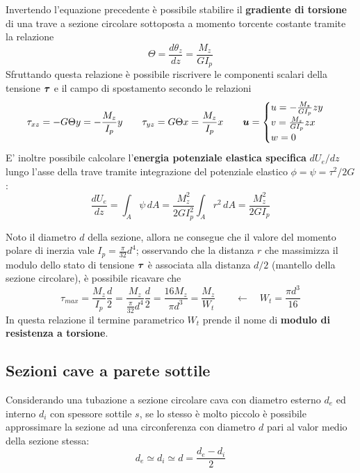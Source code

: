     	\begin{concetto}
    		Invertendo l'equazione precedente è possibile stabilire il \textbf{gradiente di torsione} di una trave a sezione circolare sottoposta a momento torcente costante tramite la relazione
    		\begin{equation}
    			\Theta = \frac{d\theta_z}{dz}= \frac{M_z}{G I_p}
    		\end{equation}
    		Sfruttando questa relazione è possibile riscrivere le componenti scalari della tensione $\boldsymbol{\tau}$ e il campo di spostamento secondo le relazioni
    		\begin{equation}
    			\tau_{xz} = -G\Theta y = - \frac{M_z}{I_p}y \qquad \tau_{yz} = G\Theta x = \frac{M_z}{I_p}x \qquad
    			\boldsymbol{u} = \begin{cases}
    				u =- \frac{M_z}{GI_p} z y \\ v =\frac{M_z}{GI_p} z x \\ w =0
    			\end{cases}
    		\end{equation}
    		E' inoltre possibile calcolare l'\textbf{energia potenziale elastica specifica} $dU_e /dz$ lungo l'asse della trave tramite integrazione del potenziale elastico $\phi = \psi = \tau^2/2G$:
    		\begin{equation}
    			\frac{dU_e}{dz} = \int_A\psi \, dA = \frac{M_z^2}{2GI_p^2} \int_Ar^2\, dA  = \frac{M_z^2}{2GI_p}
    		\end{equation}
    	\end{concetto}
    	\begin{concetto}
    		Noto il diametro $d$ della sezione, allora ne consegue che il valore del momento polare di inerzia vale $I_p = \frac \pi {32}d^4$; osservando che la distanza $r$ che massimizza il modulo dello stato di tensione $\boldsymbol{\tau}$ è associata alla distanza $d/2$ (mantello della sezione circolare), è possibile ricavare che
    		\begin{equation} \label{eq:sv:modulotorsione}
    			\tau_{max} = \frac{M_z}{I_p} \frac d 2 = \frac{M_z}{\frac{\pi}{32}d^4} \frac d 2 =\frac{16 M_z}{\pi d^3} = \frac{M_z}{W_t}  \qquad \leftarrow \quad W_t = \frac{\pi d^3}{16}
    		\end{equation}
    		In questa relazione il termine parametrico $W_t$ prende il nome di \textbf{modulo di resistenza a torsione}.
    	\end{concetto}
    	
    \subsection{Sezioni cave a parete sottile}
    	Considerando una tubazione a sezione circolare cava con diametro esterno $d_e$ ed interno $d_i$ con spessore sottile $s$, se lo stesso è molto piccolo è possibile approssimare la sezione ad una circonferenza con diametro $d$ pari al valor medio della sezione stessa:
    	\[ d_e \simeq d_i \simeq d = \frac{d_e - d_i}{2}\]
    	
